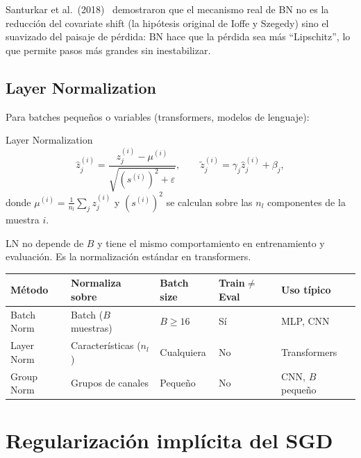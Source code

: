 Santurkar et al.\ (2018)~\cite{santurkar2018how} demostraron que el
mecanismo real de BN no es la reducción del covariate shift (la hipótesis
original de Ioffe y Szegedy) sino el suavizado del paisaje de pérdida:
BN hace que la pérdida sea más ``Lipschitz'', lo que permite pasos más
grandes sin inestabilizar.

\subsection{Layer Normalization}
\label{subsec:layer_norm}

Para batches pequeños o variables (transformers, modelos de lenguaje):

\begin{definicion}{Layer Normalization}
\label{def:ln}
\begin{equation}
  \hat{z}_j^{(i)} = \frac{z_j^{(i)}-\mu^{(i)}}
  {\sqrt{(s^{(i)})^2+\varepsilon}},
  \qquad
  \tilde{z}_j^{(i)} = \gamma_j\hat{z}_j^{(i)} + \beta_j,
  \label{eq:ln}
\end{equation}
donde $\mu^{(i)} = \frac{1}{n_l}\sum_j z_j^{(i)}$ y $(s^{(i)})^2$
se calculan sobre las $n_l$ componentes de la muestra $i$.
\end{definicion}

LN no depende de $B$ y tiene el mismo comportamiento en entrenamiento y
evaluación. Es la normalización estándar en transformers.

\begin{center}
\begin{tabular}{lllll}
\toprule
\textbf{Método} & \textbf{Normaliza sobre} & \textbf{Batch size} &
\textbf{Train$\neq$Eval} & \textbf{Uso típico} \\
\midrule
Batch Norm & Batch ($B$ muestras) & $B \geq 16$ & Sí & MLP, CNN \\
Layer Norm & Características ($n_l$) & Cualquiera & No & Transformers \\
Group Norm & Grupos de canales & Pequeño & No & CNN, $B$ pequeño \\
\bottomrule
\end{tabular}
\end{center}

\section{Regularización implícita del SGD}
\label{sec:reg_implicita}

